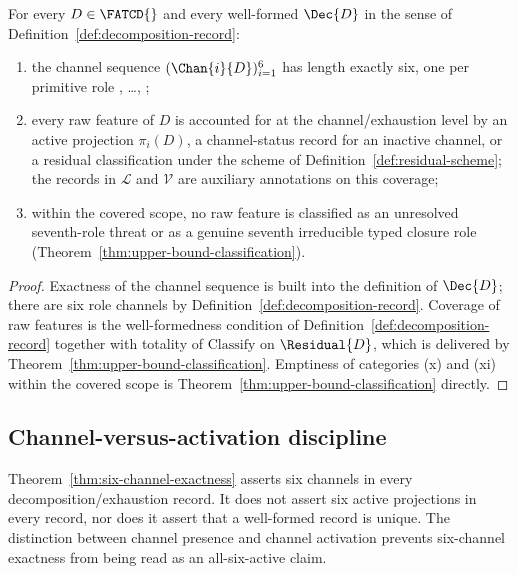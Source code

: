\begin{theorem}\label{thm:six-channel-exactness}
For every \(D \in \FATCD{}\) and every well-formed
\(\Dec{D}\) in the sense of
Definition~\ref{def:decomposition-record}:
\begin{enumerate}[label=(\roman*),topsep=2pt,itemsep=1pt]
  \item the channel sequence \((\Chan{i}{D})_{i=1}^{6}\) has length
    exactly six, one per primitive role \Pone{}, \ldots, \Psix{};
  \item every raw feature of \(D\) is accounted for at the
    channel/exhaustion level by an active projection \(\pi_i(D)\), a
    channel-status record for an inactive channel, or a residual
    classification under the scheme of
    Definition~\ref{def:residual-scheme}; the records in \(\mathcal{L}\)
    and \(\mathcal{V}\) are auxiliary annotations on this coverage;
  \item within the covered scope, no raw feature is classified as
    an unresolved seventh-role threat or as a genuine seventh
    irreducible typed closure role
    (Theorem~\ref{thm:upper-bound-classification}).
\end{enumerate}
\end{theorem}

\begin{proof}
Exactness of the channel sequence is built into the definition of
\(\Dec{D}\); there are six role channels by
Definition~\ref{def:decomposition-record}. Coverage of raw features is
the well-formedness condition of
Definition~\ref{def:decomposition-record} together with totality of
\(\mathrm{Classify}\) on \(\Residual{D}\), which is delivered by
Theorem~\ref{thm:upper-bound-classification}. Emptiness of categories
(x) and (xi) within the covered scope is
Theorem~\ref{thm:upper-bound-classification} directly.
\end{proof}

\subsection{Channel-versus-activation discipline}\label{subsec:channel-vs-activation}

Theorem~\ref{thm:six-channel-exactness} asserts six channels in every
decomposition/exhaustion record. It does not assert six active
projections in every record, nor does it assert that a well-formed
record is unique. The distinction between channel presence and
channel activation prevents six-channel exactness from being read as
an all-six-active claim.

